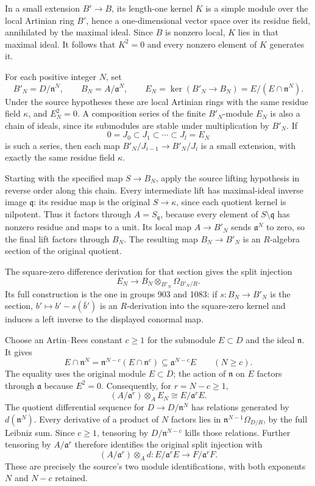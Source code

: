 In a small extension \(B'\to B\), its length-one kernel \(K\) is a simple module over the local Artinian ring \(B'\), hence a one-dimensional vector space over its residue field, annihilated by the maximal ideal. Since \(B\) is nonzero local, \(K\) lies in that maximal ideal. It follows that \(K^2=0\) and every nonzero element of \(K\) generates it.

For each positive integer \(N\), set \[
B'_N=D/\mathfrak n^N,\qquad
B_N=A/\mathfrak a^N,\qquad
E_N=\ker(B'_N\to B_N)=E/(E\cap\mathfrak n^N).
\] Under the source hypotheses these are local Artinian rings with the same residue field \(\kappa\), and \(E_N^2=0\). A composition series of the finite \(B'_N\)-module \(E_N\) is also a chain of ideals, since its submodules are stable under multiplication by \(B'_N\). If \[
0=J_0\subset J_1\subset\cdots\subset J_l=E_N
\] is such a series, then each map \(B'_N/J_{i-1}\to B'_N/J_i\) is a small extension, with exactly the same residue field \(\kappa\).

Starting with the specified map \(S\to B_N\), apply the source lifting hypothesis in reverse order along this chain. Every intermediate lift has maximal-ideal inverse image \(\mathfrak q\): its residue map is the original \(S\to\kappa\), since each quotient kernel is nilpotent. Thus it factors through \(A=S_{\mathfrak q}\), because every element of \(S\setminus\mathfrak q\) has nonzero residue and maps to a unit. Its local map \(A\to B'_N\) sends \(\mathfrak a^N\) to zero, so the final lift factors through \(B_N\). The resulting map \(B_N\to B'_N\) is an \(R\)-algebra section of the original quotient.

The square-zero difference derivation for that section gives the split injection \[
E_N\longrightarrow B_N\otimes_{B'_N}\Omega_{B'_N/R}.
\] Its full construction is the one in groups 903 and 1083: if \(s:B_N\to B'_N\) is the section, \(b'\mapsto b'-s(\bar b')\) is an \(R\)-derivation into the square-zero kernel and induces a left inverse to the displayed conormal map.

Choose an Artin--Rees constant \(c\ge1\) for the submodule \(E\subset D\) and the ideal \(\mathfrak n\). It gives \[
E\cap\mathfrak n^N
=\mathfrak n^{N-c}(E\cap\mathfrak n^c)
\subseteq\mathfrak a^{N-c}E\qquad(N\ge c).
\] The equality uses the original module \(E\subset D\); the action of \(\mathfrak n\) on \(E\) factors through \(\mathfrak a\) because \(E^2=0\). Consequently, for \(r=N-c\ge1\), \[
(A/\mathfrak a^r)\otimes_A E_N
\cong E/\mathfrak a^rE.
\] The quotient differential sequence for \(D\to D/\mathfrak n^N\) has relations generated by \(d(\mathfrak n^N)\). Every derivative of a product of \(N\) factors lies in \(\mathfrak n^{N-1}\Omega_{D/R}\), by the full Leibniz sum. Since \(c\ge1\), tensoring by \(D/\mathfrak n^{N-c}\) kills those relations. Further tensoring by \(A/\mathfrak a^r\) therefore identifies the original split injection with \[
(A/\mathfrak a^r)\otimes_A d:
E/\mathfrak a^rE\longrightarrow F/\mathfrak a^rF.
\] These are precisely the source's two module identifications, with both exponents \(N\) and \(N-c\) retained.

